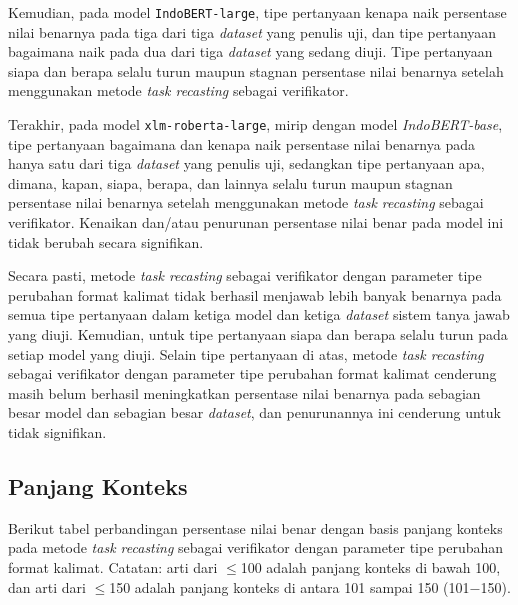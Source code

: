 Kemudian, pada model \texttt{IndoBERT-large}, tipe pertanyaan kenapa naik persentase nilai benarnya pada tiga dari tiga \emph{dataset} yang penulis uji, dan tipe pertanyaan bagaimana naik pada dua dari tiga \emph{dataset} yang sedang diuji. Tipe pertanyaan siapa dan berapa selalu turun maupun stagnan persentase nilai benarnya setelah menggunakan metode \emph{task recasting} sebagai verifikator.

Terakhir, pada model \texttt{xlm-roberta-large}, mirip dengan model \emph{IndoBERT-base}, tipe pertanyaan bagaimana dan kenapa naik persentase nilai benarnya pada hanya satu dari tiga \emph{dataset} yang penulis uji, sedangkan tipe pertanyaan apa, dimana, kapan, siapa, berapa, dan lainnya selalu turun maupun stagnan persentase nilai benarnya setelah menggunakan metode \emph{task recasting} sebagai verifikator. Kenaikan dan/atau penurunan persentase nilai benar pada model ini tidak berubah secara signifikan.

Secara pasti, metode \emph{task recasting} sebagai verifikator dengan parameter tipe perubahan format kalimat tidak berhasil menjawab lebih banyak benarnya pada semua tipe pertanyaan dalam ketiga model dan ketiga \emph{dataset} sistem tanya jawab yang diuji. Kemudian, untuk tipe pertanyaan siapa dan berapa selalu turun pada setiap model yang diuji. Selain tipe pertanyaan di atas, metode \emph{task recasting} sebagai verifikator dengan parameter tipe perubahan format kalimat cenderung masih belum berhasil meningkatkan persentase nilai benarnya pada sebagian besar model dan sebagian besar \emph{dataset}, dan penurunannya ini cenderung untuk tidak signifikan.

\subsection{Panjang Konteks}
Berikut tabel perbandingan persentase nilai benar dengan basis panjang konteks pada metode \emph{task recasting} sebagai verifikator dengan parameter tipe perubahan format kalimat. Catatan: arti dari $\leq$100 adalah panjang konteks di bawah 100, dan arti dari $\leq$150 adalah panjang konteks di antara 101 sampai 150 (101$-$150).

